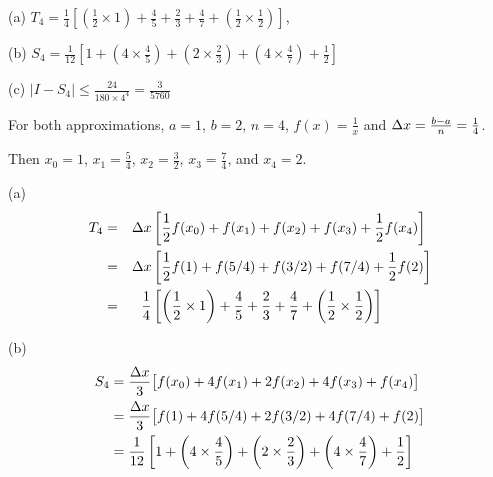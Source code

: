 \begin{answer}
(a)  $\displaystyle T_4
=\frac{1}{4}\left[\left(\frac{1}{2}\times 1\right)+\frac{4}{5}+\frac{2}{3}+ \frac{4}{7}+\left(\frac{1}{2}\times\frac{1}{2}\right)\right]$,

\noindent
(b) $\displaystyle S_4
=\frac{1}{12}\left[1+\left(4\times\frac{4}{5}\right)+\left(2\times \frac{2}{3}\right)+\left(4\times \frac{4}{7}\right)+\frac{1}{2}\right]$

\noindent
(c) $\displaystyle\Big|I -S_4\Big|
                \le \frac{24}{180\times 4^4}=\frac{3}{5760}$

\end{answer}

\begin{solution}
For both approximations, $a=1$, $b=2$, $n=4$, $f(x)=\frac{1}{x}$ and $\Delta x=\frac{b-a}{n}=\frac{1}{4}$.

Then $x_0 = 1$, $x_1=\frac{5}{4}$, $x_2 = \frac{3}{2}$, $x_3=\frac{7}{4}$, and $x_4=2$.


  \begin{center}
  \end{center}



\noindent (a)
\begin{alignat*}{3}
T_4&=&\Delta x&\left[\frac{1}{2}f(x_0)+f(x_1)+f(x_2)+f(x_3)+\frac{1}{2}f(x_4)\right]\\
&=&\Delta x&\left[\frac{1}{2}f(1)+f(5/4)+f(3/2)+f(7/4)+\frac{1}{2}f(2)\right]\\
&=&\frac{1}{4}&\left[\left(\frac{1}{2}\times 1\right)+\frac{4}{5}+\frac{2}{3}+ \frac{4}{7}+\left(\frac{1}{2}\times\frac{1}{2}\right)\right]
\end{alignat*}

\noindent (b)
\begin{align*}
S_4&=\frac{\Delta x}{3}\big[f(x_0)+4f(x_1)+2f(x_2)+4f(x_3)+f(x_4)\big]\\
&=\frac{\Delta x}{3}\big[f(1)+4f(5/4)+2f(3/2)+4f(7/4)+f(2)\big]\\
&=\frac{1}{12}\left[1+\left(4\times\frac{4}{5}\right)+\left(2\times \frac{2}{3}\right)+\left(4\times \frac{4}{7}\right)+\frac{1}{2}\right]
\end{align*}


\end{solution}
